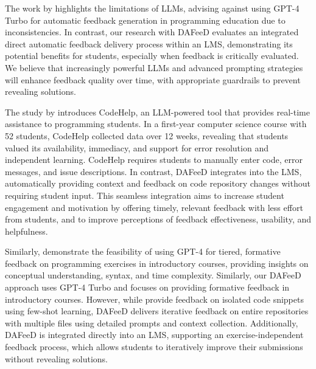 \documentclass[manuscript,screen,review]{acmart}
\begin{document}
The work by \citet{azaiz:2024:FeedbackGenerationProgrammingExercises} highlights the limitations of LLMs, advising against using GPT-4 Turbo for automatic feedback generation in programming education due to inconsistencies. In contrast, our research with DAFeeD evaluates an integrated direct automatic feedback delivery process within an LMS, demonstrating its potential benefits for students, especially when feedback is critically evaluated. We believe that increasingly powerful LLMs and advanced prompting strategies will enhance feedback quality over time, with appropriate guardrails to prevent revealing solutions.


The study by \citet{liffiton:2024:CodeHelpUsingLarge} introduces CodeHelp, an LLM-powered tool that provides real-time assistance to programming students. In a first-year computer science course with 52 students, CodeHelp collected data over 12 weeks, revealing that students valued its availability, immediacy, and support for error resolution and independent learning. CodeHelp requires students to manually enter code, error messages, and issue descriptions. In contrast, DAFeeD integrates into the LMS, automatically providing context and feedback on code repository changes without requiring student input. This seamless integration aims to increase student engagement and motivation by offering timely, relevant feedback with less effort from students, and to improve perceptions of feedback effectiveness, usability, and helpfulness.


Similarly, \citet{nguyen:2024:UsingGPT4Providea} demonstrate the feasibility of using GPT-4 for tiered, formative feedback on programming exercises in introductory courses, providing insights on conceptual understanding, syntax, and time complexity. Similarly, our DAFeeD approach uses GPT-4 Turbo and focuses on providing formative feedback in introductory courses. However, while \citeauthor{nguyen:2024:UsingGPT4Providea} provide feedback on isolated code snippets using few-shot learning, DAFeeD delivers iterative feedback on entire repositories with multiple files using detailed prompts and context collection. Additionally, DAFeeD is integrated directly into an LMS, supporting an exercise-independent feedback process, which allows students to iteratively improve their submissions without revealing solutions.
\end{document}
